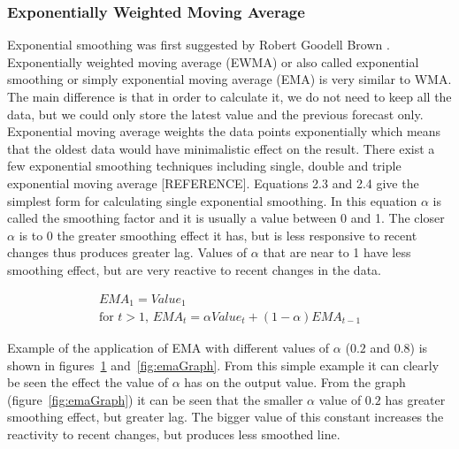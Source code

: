 \subsubsection{Exponentially Weighted Moving Average}
Exponential smoothing was first suggested by Robert Goodell Brown \cite{FOR3980040103}. Exponentially weighted moving average (EWMA) or also called exponential smoothing or simply exponential moving average (EMA) is very similar to WMA. The main difference is that in order to calculate it, we do not need to keep all the data, but we could only store the latest value and the previous forecast only. Exponential moving average weights the data points exponentially which means that the oldest data would have minimalistic effect on the result. There exist a few exponential smoothing techniques including single, double and triple exponential moving average [REFERENCE]. Equations 2.3 and 2.4 give the simplest form for calculating single exponential smoothing. In this equation $\alpha$ is called the smoothing factor and it is usually a value between 0 and 1. The closer $\alpha$ is to 0 the greater smoothing effect it has, but is less responsive to recent changes thus produces greater lag. Values of $\alpha$ that are near to 1 have less smoothing effect, but are very reactive to recent changes in the data. 

\begin{align}\label{ema}
EMA_1 = Value_1 \\
\textrm{for } t > 1\textrm{, }EMA_t = \alpha Value_t + (1-\alpha) EMA_{t-1}
\end{align}

Example of the application of EMA with different values of $\alpha$ ($0.2$ and $0.8$) is shown in figures~\ref{fig:emaTable} and~\ref{fig:emaGraph}. From this simple example it can clearly be seen the effect the value of $\alpha$ has on the output value. From the graph (figure~\ref{fig:emaGraph}) it can be seen that the smaller $\alpha$ value of $0.2$ has greater smoothing effect, but greater lag. The bigger value of this constant increases the reactivity to recent changes, but produces less smoothed line.
\begin{figure}[ht]
	\caption{}
	\label{fig:emaTable}
\end{figure}


